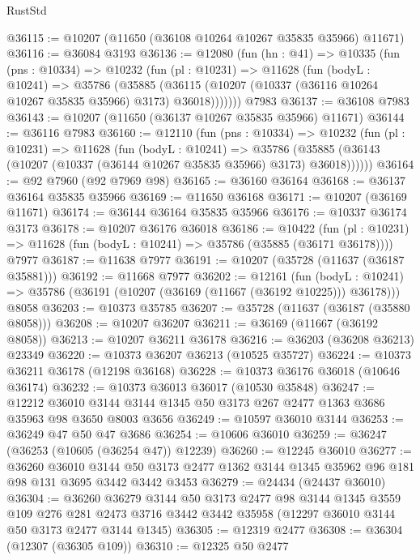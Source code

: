\begin{lexlean}{RustStd}
\begin{coremodule}
@36115 := @10207 (@11650 (@36108 @10264 @10267 @35835 @35966) @11671)
@36116 := @36084 @3193
@36136 := @12080
    (fun (hn : @41) =>
    @10335
      (fun (pns : @10334) =>
      @10232
        (fun (pl : @10231) =>
        @11628
          (fun (bodyL : @10241) =>
          @35786
            (@35885
              (@36115 (@10207 (@10337 (@36116 @10264 @10267 @35835 @35966) @3173) @36018)))))))
    @7983
@36137 := @36108 @7983
@36143 := @10207 (@11650 (@36137 @10267 @35835 @35966) @11671)
@36144 := @36116 @7983
@36160 := @12110
    (fun (pns : @10334) =>
    @10232
      (fun (pl : @10231) =>
      @11628
        (fun (bodyL : @10241) =>
        @35786 (@35885 (@36143 (@10207 (@10337 (@36144 @10267 @35835 @35966) @3173) @36018))))))
@36164 := @92 @7960 (@92 @7969 @98)
@36165 := @36160 @36164
@36168 := @36137 @36164 @35835 @35966
@36169 := @11650 @36168
@36171 := @10207 (@36169 @11671)
@36174 := @36144 @36164 @35835 @35966
@36176 := @10337 @36174 @3173
@36178 := @10207 @36176 @36018
@36186 := @10422
    (fun (pl : @10231) => @11628 (fun (bodyL : @10241) => @35786 (@35885 (@36171 @36178))))
    @7977
@36187 := @11638 @7977
@36191 := @10207 (@35728 (@11637 (@36187 @35881)))
@36192 := @11668 @7977
@36202 := @12161
    (fun (bodyL : @10241) => @35786 (@36191 (@10207 (@36169 (@11667 (@36192 @10225))) @36178)))
    @8058
@36203 := @10373 @35785
@36207 := @35728 (@11637 (@36187 (@35880 @8058)))
@36208 := @10207 @36207
@36211 := @36169 (@11667 (@36192 @8058))
@36213 := @10207 @36211 @36178
@36216 := @36203 (@36208 @36213) @23349
@36220 := @10373 @36207 @36213 (@10525 @35727)
@36224 := @10373 @36211 @36178 (@12198 @36168)
@36228 := @10373 @36176 @36018 (@10646 @36174)
@36232 := @10373 @36013 @36017 (@10530 @35848)
@36247 := @12212
    @36010
    @3144
    @3144
    @1345
    @50
    @3173
    @267
    @2477
    @1363
    @3686
    @35963
    @98
    @3650
    @8003
    @3656
@36249 := @10597 @36010 @3144
@36253 := @36249 @47 @50 @47 @3686
@36254 := @10606 @36010
@36259 := @36247 (@36253 (@10605 (@36254 @47)) @12239)
@36260 := @12245 @36010
@36277 := @36260
    @36010
    @3144
    @50
    @3173
    @2477
    @1362
    @3144
    @1345
    @35962
    @96
    @181
    @98
    @131
    @3695
    @3442
    @3442
    @3453
@36279 := @24434 (@24437 @36010)
@36304 := @36260
    @36279
    @3144
    @50
    @3173
    @2477
    @98
    @3144
    @1345
    @3559
    @109
    @276
    @281
    @2473
    @3716
    @3442
    @3442
    @35958
    (@12297 @36010 @3144 @50 @3173 @2477 @3144 @1345)
@36305 := @12319 @2477
@36308 := @36304 (@12307 (@36305 @109))
@36310 := @12325 @50 @2477

\end{coremodule}
\end{lexlean}
